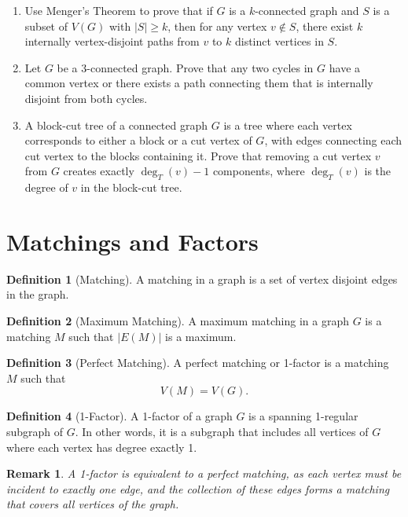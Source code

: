 \documentclass{article}
\newtheorem{remark}{Remark}
\theoremstyle{definition}
\newtheorem{definition}{Definition}
\begin{document}
\begin{enumerate}
\item Use Menger's Theorem to prove that if $G$ is a $k$-connected graph and $S$ is a subset of $V(G)$ with $|S| \geq k$, then for any vertex $v \not\in S$, there exist $k$ internally vertex-disjoint paths from $v$ to $k$ distinct vertices in $S$.

\item Let $G$ be a $3$-connected graph. Prove that any two cycles in $G$ have a common vertex or there exists a path connecting them that is internally disjoint from both cycles.

\item A block-cut tree of a connected graph $G$ is a tree where each vertex corresponds to either a block or a cut vertex of $G$, with edges connecting each cut vertex to the blocks containing it. Prove that removing a cut vertex $v$ from $G$ creates exactly $\deg_T(v) - 1$ components, where $\deg_T(v)$ is the degree of $v$ in the block-cut tree.
\end{enumerate}
\pagebreak
\newpage

\section{Matchings and Factors}

\begin{definition}[Matching]
A matching in a graph is a set of vertex disjoint edges in the graph.
\end{definition}

\begin{definition}[Maximum Matching]
A maximum matching in a graph $G$ is a matching $M$ such that $|E(M)|$ is a maximum.
\end{definition}

\begin{definition}[Perfect Matching]
A perfect matching or 1-factor is a matching $M$ such that 
\[V(M) = V(G).\]
\end{definition}


\begin{definition}[1-Factor]
A 1-factor of a graph $G$ is a spanning 1-regular subgraph of $G$. In other words, it is a subgraph that includes all vertices of $G$ where each vertex has degree exactly 1.
\end{definition}

\begin{remark}
A 1-factor is equivalent to a perfect matching, as each vertex must be incident to exactly one edge, and the collection of these edges forms a matching that covers all vertices of the graph.
\end{remark}
\end{document}
